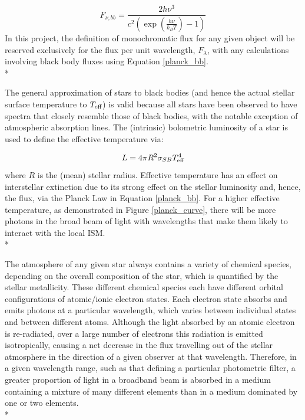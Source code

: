 \documentclass[12pt, a4paper]{report}
\begin{document}
\begin{equation}
F_{\nu,bb} = \frac{2h\nu^{3}}{c^{2}\left(\exp\left({\frac{h\nu}{k_{B}T}}\right) - 1\right)}
\label{planck_bb_freq}
\end{equation}
In this project, the definition of monochromatic flux for any given object will be reserved exclusively for the flux per unit wavelength, $F_{\lambda}$, with any calculations involving black body fluxes using Equation \ref{planck_bb}. \\*

The general approximation of stars to black bodies (and hence the actual stellar surface temperature to $T_{\textnormal{eff}}$) is valid because all stars have been observed to have spectra that closely resemble those of black bodies, with the notable exception of atmospheric absorption lines. The (intrinsic) bolometric luminosity of a star is used to define the effective temperature via:

\begin{equation}
L = 4 \pi R^{2} \sigma_{SB} T_{\textnormal{eff}}^{4}
\label{Teff_def}
\end{equation}
where $R$ is the (mean) stellar radius. Effective temperature has an effect on interstellar extinction due to its strong effect on the stellar luminosity and, hence, the flux, via the Planck Law in Equation \ref{planck_bb}. For a higher effective temperature, as demonstrated in Figure \ref{planck_curve}, there will be more photons in the broad beam of light with wavelengths that make them likely to interact with the local ISM. \\*

The atmosphere of any given star always contains a variety of chemical species, depending on the overall composition of the star, which is quantified by the stellar metallicity. These different chemical species each have different orbital configurations of atomic/ionic electron states. Each electron state absorbs and emits photons at a particular wavelength, which varies between individual states and between different atoms. Although the light absorbed by an atomic electron is re-radiated, over a large number of electrons this radiation is emitted isotropically, causing a net decrease in the flux travelling out of the stellar atmosphere in the direction of a given observer at that wavelength. Therefore, in a given wavelength range, such as that defining a particular photometric filter, a greater proportion of light in a broadband beam is absorbed in a medium containing a mixture of many different elements than in a medium dominated by one or two elements.\\*
\end{document}

